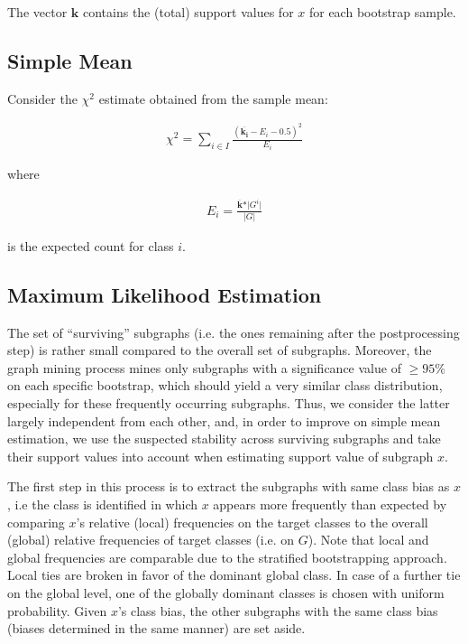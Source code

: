 \documentclass{article}
\begin{document}
The vector $\mathbf{k}$ contains the (total) support values for $x$ for each bootstrap sample.

\subsection{Simple Mean}
\label{ss:simple-mean}

Consider the $\chi^2$ estimate obtained from the sample mean:

\begin{align}
  \chi^2 = \sum_{i \in I} \frac{(\overline{\mathbf{k_i}}-E_i-0.5)^2}{E_i} 
  \label{align:meanX2}
\end{align}

where 

\begin{align}
  E_i=\frac{\overline{\mathbf{k}}*\vert G^i\vert}{\vert G \vert}
\end{align}

is the expected count for class $i$.

\subsection{Maximum Likelihood Estimation}
\label{ss:MLE}

The set of ``surviving'' subgraphs (i.e. the ones remaining after the
postprocessing step) is rather small compared to the overall set of subgraphs.
Moreover, the graph mining process mines only subgraphs with a significance
value of $\ge 95\%$ on each specific bootstrap, which should yield a very similar
class distribution, especially for these frequently occurring subgraphs.  Thus,
we consider the latter largely independent from each other, and, in order to
improve on simple mean estimation, we use the suspected stability across
surviving subgraphs and take their support values into account when estimating
support value of subgraph $x$. 

The first step in this process is to extract the subgraphs with same class bias
as $x$, i.e the class is identified in which $x$ appears more frequently than
expected by comparing $x$'s relative (local) frequencies on the target classes
to the overall (global) relative frequencies of target classes (i.e. on $G$).
Note that local and global frequencies are comparable due to the stratified
bootstrapping approach. Local ties are broken in favor of the dominant global
class. In case of a further tie on the global level, one of the globally
dominant classes is chosen with uniform probability. Given $x$'s class bias,
the other subgraphs with the same class bias (biases determined in the same
manner) are set aside.
\end{document}

